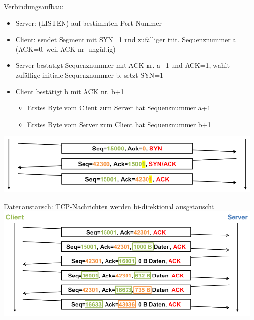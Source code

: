 \begin{example}
    Verbindungsaufbau:
    \begin{itemize}
        \item Server: (LISTEN) auf bestimmten Port Nummer
        \item Client: sendet Segment mit SYN=1 und zufälliger init. Sequenznummer a (ACK=0, weil ACK nr. ungültig)
        \item Server bestätigt Sequenznummer mit ACK nr. a+1 und ACK=1, wählt zufällige initiale Sequenznummer b, setzt SYN=1
        \item Client bestätigt b mit ACK nr. b+1 
        \begin{itemize}
            \item Erstes Byte vom Client zum Server hat Sequenznummer a+1
            \item Erstes Byte vom Server zum Client hat Sequenznummer b+1
        \end{itemize}
    \end{itemize}
        \includegraphics[width=1\linewidth]{images/example_verbindungsaufbau_tcp.png}
\end{example}

\begin{example}
    Datenaustausch: TCP-Nachrichten werden bi-direktional ausgetauscht\\
        \includegraphics[width=1\linewidth]{images/tcp_datenaustausch_ex.png}
\end{example}

